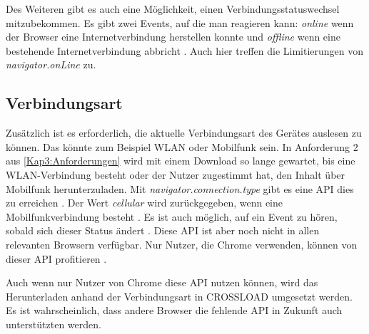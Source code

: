 Des Weiteren gibt es auch eine Möglichkeit, einen Verbindungsstatuswechsel mitzubekommen. Es gibt zwei Events, auf die man reagieren kann: \emph{online} wenn der Browser eine Internetverbindung herstellen konnte und \emph{offline} wenn eine bestehende Internetverbindung abbricht \autocite{mdn-online} \autocite{Freeman2020}. Auch hier treffen die Limitierungen von \emph{navigator.onLine} zu.

\subsection{Verbindungsart}
Zusätzlich ist es erforderlich, die aktuelle Verbindungsart des Gerätes auslesen zu können. Das könnte zum Beispiel WLAN oder Mobilfunk sein. In Anforderung 2 aus \autoref{Kap3:Anforderungen} wird mit einem Download so lange gewartet, bis eine WLAN-Verbindung besteht oder der Nutzer zugestimmt hat, den Inhalt über Mobilfunk herunterzuladen. Mit \emph{navigator.connection.type} gibt es eine \ac{API} dies zu erreichen \autocite{network-type-mdn}. Der Wert \textit{cellular} wird zurückgegeben, wenn eine Mobilfunkverbindung besteht \autocite{network-type-mdn}. Es ist auch möglich, auf ein Event zu hören, sobald sich dieser Status ändert \autocite{network-information-mdn}. Diese \ac{API} ist aber noch nicht in allen relevanten Browsern verfügbar. Nur Nutzer, die Chrome verwenden, können von dieser \ac{API} profitieren \autocite{network-type-mdn}.

Auch wenn nur Nutzer von Chrome diese \ac{API} nutzen können, wird das Herunterladen anhand der Verbindungsart in CROSSLOAD umgesetzt werden. Es ist wahrscheinlich, dass andere Browser die fehlende \ac{API} in Zukunft auch unterstützten werden.
